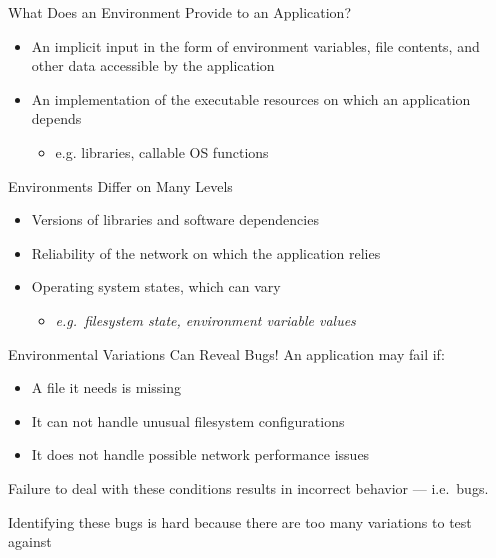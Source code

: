 \documentclass[pdf]{beamer}
\begin{document}
\begin{frame}{What Does an Environment Provide to an Application?}
  \begin{itemize}
    \item{An implicit input in the form of environment variables, file
      contents, and other data accessible by the application}
    \item{An implementation of the executable resources on which an application depends}
      \begin{itemize}
        \item{e.g. libraries, callable OS functions}
      \end{itemize}
  \end{itemize}
\end{frame}


\begin{frame}{Environments Differ on Many Levels}
  \begin{itemize}
    \item{Versions of libraries and software dependencies}
    \item{Reliability of the network on which the application relies}
    \item{Operating system states, which can vary}
      \begin{itemize}
        \item{\textit{e.g.\ filesystem state, environment variable values}}
      \end{itemize}
  \end{itemize}
\end{frame}


\begin{frame}{Environmental Variations Can Reveal Bugs!}
  An application may fail if:
  \begin{itemize}
    \item{A file it needs is missing}
    \item{It can not handle unusual filesystem configurations}
    \item{It does not handle possible network performance issues}

  \end{itemize}
  Failure to deal with these conditions results in incorrect behavior --- i.e.\ bugs.

  Identifying these bugs is hard because there are too many variations to
  test against
\end{frame}
\end{document}
